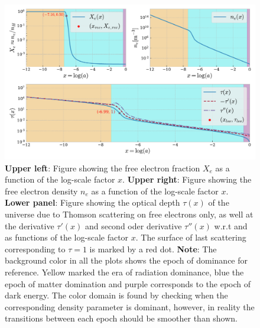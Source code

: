 \documentclass[twocolumn]{aastex62}
\begin{document}
\begin{figure}
    \includegraphics[scale = 0.65]{Figures/Xe_ne_tau.pdf}
    \caption{\textbf{Upper left}: Figure showing the free electron fraction $X_e$ 
    as a function of the log-scale factor $x$. \textbf{Upper right}: Figure showing the free electron density $n_e$
    as a function of the log-scale factor $x$. \textbf{Lower panel}: Figure showing the optical depth $\tau(x)$ of the universe due to 
    Thomson scattering on free electrons only, as well at the derivative $\tau'(x)$ and second oder derivative $\tau''(x)$ w.r.t 
    and as functions of the log-scale factor $x$. The surface of last scattering corresponding to $\tau = 1$ is marked by a red dot. \textbf{Note}: The background color in all the plots shows the epoch of dominance
    for reference. Yellow marked the era of radiation dominance, blue the epoch of matter domination
    and purple corresponds to the epoch of dark energy. The color domain is found by checking 
    when the corresponding density parameter is dominant,
    however, in reality the transitions between each epoch should be smoother than shown.}
    \label{fig:Xe}
\end{figure}
\end{document}
